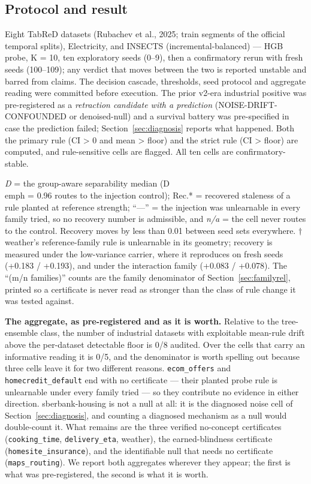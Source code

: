 \documentclass[10pt]{article} %
\begin{document}
\subsection{Protocol and result}\label{sec:panel}

Eight TabReD datasets (Rubachev et al., 2025; train segments of the official temporal splits),
Electricity, and INSECTS (incremental-balanced) --- HGB probe, K = 10, ten exploratory seeds (0--9),
then a confirmatory rerun with fresh seeds (100--109); any verdict that moves between the two is
reported unstable and barred from claims. The decision cascade, thresholds, seed protocol and
aggregate reading were committed before execution. The prior v2-era industrial positive was
pre-registered as a \emph{retraction candidate with a prediction} (NOISE-DRIFT-CONFOUNDED or
denoised-null) and a survival battery was pre-specified in case the prediction failed; Section~\ref{sec:diagnosis} reports
what happened. Both the primary rule (CI > 0 and mean > floor) and the strict rule (CI > floor) are
computed, and rule-sensitive cells are flagged. All ten cells are confirmatory-stable.

\emph{D} = the group-aware separability median (D\\emph{ = 0.96 routes to the injection control); }Rec.* =
recovered staleness of a rule planted at reference strength; ``---'' = the injection was unlearnable in
every family tried, so no recovery number is admissible, and \emph{n/a} = the cell never routes to the
control. Recovery moves by less than 0.01 between seed sets everywhere. $\dagger$ weather's reference-family
rule is unlearnable in its geometry; recovery is measured under the low-variance carrier, where it
reproduces on fresh seeds (+0.183 / +0.193), and under the interaction family (+0.083 / +0.078).
The ``(m/n families)'' counts are the family denominator of Section~\ref{sec:familyrel}, printed so a certificate is never
read as stronger than the class of rule change it was tested against.

\textbf{The aggregate, as pre-registered and as it is worth.} Relative to the tree-ensemble class, the
number of industrial datasets with exploitable mean-rule drift above the per-dataset detectable
floor is 0/8 audited. Over the cells that carry an informative reading it is 0/5, and the
denominator is worth spelling out because three cells leave it for two different reasons.
\texttt{ecom\_offers} and \texttt{homecredit\_default} end with no certificate --- their planted probe rule is unlearnable
under every family tried --- so they contribute no evidence in either direction. sberbank-housing is
not a null at all: it is the diagnosed noise cell of Section~\ref{sec:diagnosis}, and counting a diagnosed mechanism as a
null would double-count it. What remains are the three verified no-concept certificates
(\texttt{cooking\_time}, \texttt{delivery\_eta}, weather), the earned-blindness certificate (\texttt{homesite\_insurance}), and
the identifiable null that needs no certificate (\texttt{maps\_routing}). We report both aggregates wherever
they appear; the first is what was pre-registered, the second is what it is worth.
\end{document}
